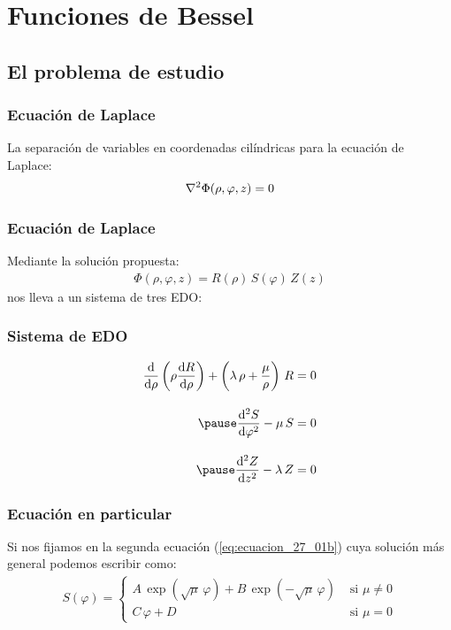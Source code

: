 \documentclass[12pt]{beamer}
\begin{document}
\section{Funciones de Bessel}
\subsection{El problema de estudio}

\begin{frame}
\frametitle{Ecuación de Laplace}
La separación de variables en coordenadas cilíndricas para la ecuación de Laplace:
\pause
\begin{align*}
\laplacian{\Phi} (\rho, \varphi, z) = 0
\end{align*}
\end{frame}
\begin{frame}
\frametitle{Ecuación de Laplace}    
Mediante la solución propuesta:
\begin{align*}
\Phi (\rho, \varphi, z) = R (\rho) \, S (\varphi) \, Z (z)
\end{align*}
nos lleva a un sistema de tres EDO:
\end{frame}
\begin{frame}
\frametitle{Sistema de EDO}
\begin{eqnarray}
\begin{aligned}
\dv{\rho} \left( \rho \dv{R}{\rho} \right) + \left( \lambda \, \rho + \dfrac{\mu}{\rho} \right) \, R &= 0 \label{eq:ecuacion_27_01a} \\[1em] \pause
\dv[2]{S}{\varphi} - \mu \, S &= 0 \label{eq:ecuacion_27_01b}\\[1em] \pause
\dv[2]{Z}{z} - \lambda \, Z &= 0 \label{eq:ecuacion_27_01c}
\end{aligned}
\end{eqnarray}
\end{frame}
\begin{frame}
\frametitle{Ecuación en particular}
Si nos fijamos en la segunda ecuación (\ref{eq:ecuacion_27_01b}) cuya solución más general podemos escribir como:
\pause
\begin{align}
S (\varphi) = \begin{cases}
A \, \exp(\sqrt{\mu} \, \varphi) {+} B \, \exp(-\sqrt{\mu} \, \varphi) & \mbox{ si } \mu \neq 0 \\
C \,\varphi + D & \mbox { si } \mu = 0
\end{cases}
\label{eq:ecuacion_27_02}
\end{align}
\end{frame}
\end{document}
